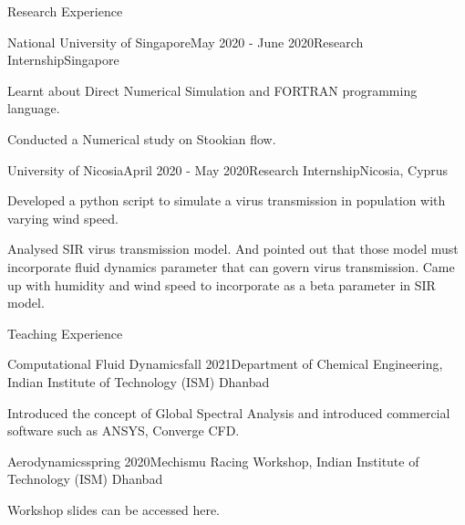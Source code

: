 \documentclass{resume} %
\begin{document}
\begin{rSection}{Research Experience}

\begin{rSubsection}{National University of Singapore}{May 2020 - June 2020}{Research Internship}{Singapore}
\item Learnt about Direct Numerical Simulation and FORTRAN programming language.
\item Conducted a Numerical study on Stookian flow. 
\end{rSubsection}
\begin{rSubsection}{University of Nicosia}{April 2020 - May 2020}{Research Internship}{Nicosia, Cyprus}
\item Developed a python script to simulate a virus transmission in population with varying wind speed. 
\item Analysed SIR virus transmission model. And pointed out that those model must incorporate fluid dynamics parameter that can govern virus transmission. Came up with humidity and wind speed to incorporate as a beta parameter in SIR model.  

\end{rSubsection}

\end{rSection}


\begin{rSection}{Teaching Experience}
\begin{rSubsection}{Computational Fluid Dynamics}{fall 2021}{Department of Chemical Engineering, Indian Institute of Technology (ISM) Dhanbad}
\item Introduced the concept of Global Spectral Analysis and introduced commercial software such as ANSYS, Converge CFD.
\end{rSubsection}

\begin{rSubsection}{Aerodynamics}{spring 2020}{Mechismu Racing Workshop, Indian Institute of Technology (ISM) Dhanbad}
\item Workshop slides can be accessed here.
\end{rSubsection}
\end{rSection}
\end{document}

